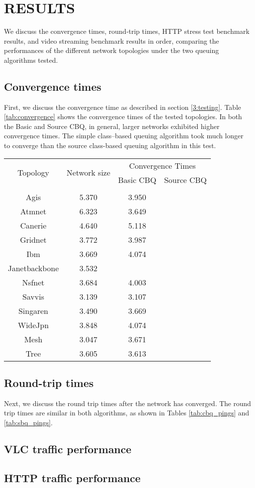 \chapter{RESULTS}
We discuss the convergence times, round-trip times, HTTP stress test benchmark results, and video streaming benchmark results in order, comparing the performances of the different network topologies under the two queuing algorithms tested.

\section{Convergence times}
First, we discuss the convergence time as described in section \ref{3:testing}. Table \ref{tab:convergence} shows the convergence times of the tested topologies. In both the Basic and Source CBQ, in general, larger networks exhibited higher convergence times. The simple class--based queuing algorithm took much longer to converge than the source class-based queuing algorithm in this test.

\begin{table}[htbp]
    \centering
    \begin{tabular}{cccc}
        \toprule
        \multirow{2}{*}{Topology} & \multirow{2}{*}{Network size}& \multicolumn{2}{c}{Convergence Times} \\
        & & Basic CBQ & Source CBQ \\
        \midrule \\

        Agis & 5.370 & 3.950 & \\
        Atmnet & 6.323 & 3.649 & \\
        Canerie & 4.640 & 5.118 & \\
        Gridnet & 3.772 & 3.987 & \\
        Ibm & 3.669 & 4.074 & \\
        Janetbackbone & 3.532 & & \\
        Nsfnet & 3.684 & 4.003 & \\
        Savvis & 3.139 & 3.107 & \\
        Singaren & 3.490 & 3.669 & \\
        WideJpn & 3.848 & 4.074 & \\
        Mesh & 3.047 & 3.671 & \\
        Tree & 3.605 & 3.613 & \\
        \bottomrule
    \end{tabular}
\end{table}

\section{Round-trip times}
Next, we discuss the round trip times after the network has converged. The round trip times are similar in both algorithms, as shown in Tables \ref{tab:cbq_pings} and \ref{tab:sbq_pings}.

\section{VLC traffic performance}

\section{HTTP traffic performance}

